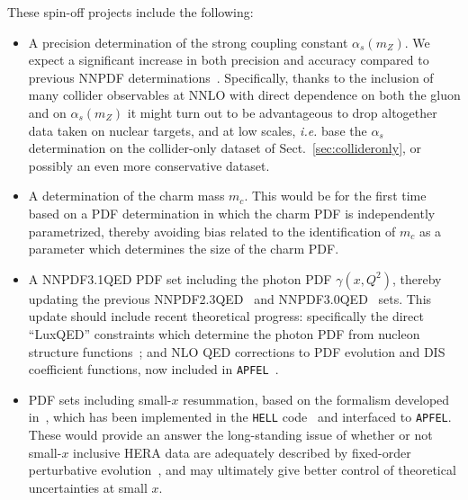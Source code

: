 These spin-off projects include the following:
\begin{itemize}
\item A precision
determination of the strong coupling constant $\alpha_s(m_Z)$.
%
We expect a significant increase in both precision and accuracy compared to previous
NNPDF determinations~\cite{Lionetti:2011pw,Ball:2011us}. Specifically,
thanks to the inclusion of many collider observables
at NNLO with direct dependence on both the gluon and on
$\alpha_s(m_Z)$
 it might turn out to be advantageous to drop 
altogether data taken on nuclear targets, and at low scales, {\it i.e.} base
the $\alpha_s$ determination on the  collider-only dataset of
Sect.~\ref{sec:collideronly}, or possibly an even more conservative dataset.
\item A determination of the charm mass  $m_c$. This would be for the
  first time based on a PDF determination in which the charm PDF is
  independently parametrized, thereby avoiding bias related to the identification of $m_c$
  as a parameter which determines the size of the charm PDF.
\item A NNPDF3.1QED PDF set including the photon PDF $\gamma(x,Q^2)$, thereby updating
  the previous NNPDF2.3QED~\cite{Ball:2013hta} and
  NNPDF3.0QED~\cite{Bertone:2016ume} sets. This update should
  include recent theoretical progress: specifically the direct ``LuxQED''
  constraints which determine  the photon PDF from nucleon
  structure functions~\cite{Manohar:2016nzj};
and  NLO QED corrections to PDF evolution and DIS coefficient
functions, now included in {\tt APFEL}~\cite{Bertone:2013vaa}. 
\item PDF sets including small-$x$ resummation, based on the formalism
developed in~\cite{Altarelli:2005ni,Ball:2007ra,Altarelli:2008aj}, which
has been implemented in the {\tt HELL} code~\cite{Bonvini:2016wki}
and interfaced to {\tt APFEL}.
%
These  would provide an  answer the long-standing
issue of whether or not small-$x$ inclusive HERA data are adequately described
by fixed-order perturbative
evolution~\cite{Caola:2010cy,Caola:2009iy}, and may ultimately give
better control  
of theoretical uncertainties at small $x$.
\end{itemize}

